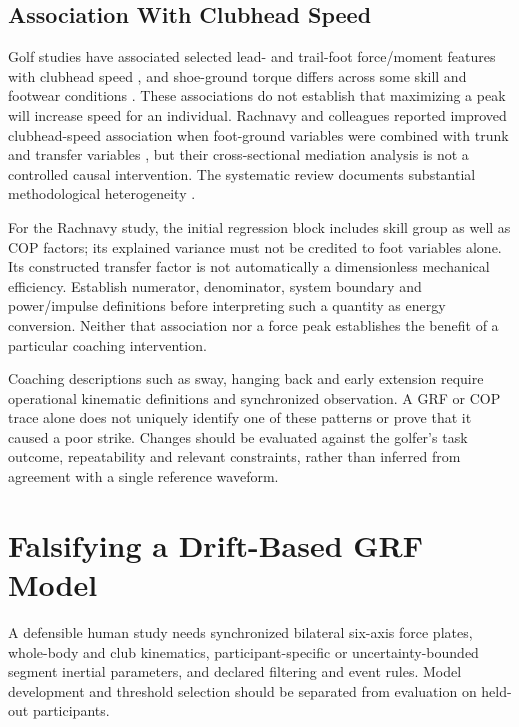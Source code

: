 \subsection{Association With Clubhead Speed}\label{grf-association-with-clubhead-speed}

Golf studies have associated selected lead- and trail-foot force/moment features with clubhead speed \citep{han2019}, and shoe-ground torque differs across some skill and footwear conditions \citep{worsfold2008}. These associations do not establish that maximizing a peak will increase speed for an individual. Rachnavy and colleagues reported improved clubhead-speed association when foot-ground variables were combined with trunk and transfer variables \citep{frontiers2026footground}, but their cross-sectional mediation analysis is not a controlled causal intervention. The systematic review documents substantial methodological heterogeneity \citep{watson2026grf}.

For the Rachnavy study, the initial regression block includes skill group as well as COP factors; its explained variance must not be credited to foot variables alone. Its constructed transfer factor is not automatically a dimensionless mechanical efficiency. Establish numerator, denominator, system boundary and power/impulse definitions before interpreting such a quantity as energy conversion. Neither that association nor a force peak establishes the benefit of a particular coaching intervention.

Coaching descriptions such as sway, hanging back and early extension require operational kinematic definitions and synchronized observation. A GRF or COP trace alone does not uniquely identify one of these patterns or prove that it caused a poor strike. Changes should be evaluated against the golfer's task outcome, repeatability and relevant constraints, rather than inferred from agreement with a single reference waveform.

\section{Falsifying a Drift-Based GRF Model}\label{grf-falsifying-a-drift-based-grf-model}

A defensible human study needs synchronized bilateral six-axis force plates, whole-body and club kinematics, participant-specific or uncertainty-bounded segment inertial parameters, and declared filtering and event rules. Model development and threshold selection should be separated from evaluation on held-out participants.

